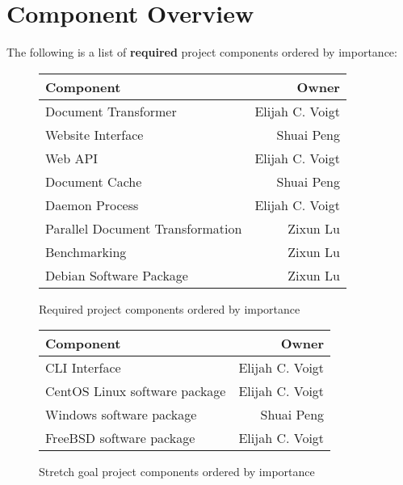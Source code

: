 \section{Component Overview}
\label{component-overview}

The following is a list of \textbf{required} project components ordered by importance:

\begin{figure}
\begin{center}
    \begin{tabular}{ | l | r | }
    \hline
      Component & Owner \\ \hline
      Document Transformer & Elijah C. Voigt \\ \hline
      Website Interface & Shuai Peng \\ \hline
      Web API & Elijah C. Voigt \\ \hline
      Document Cache & Shuai Peng \\ \hline
      Daemon Process & Elijah C. Voigt \\ \hline
      Parallel Document Transformation & Zixun Lu \\ \hline
      Benchmarking & Zixun Lu \\ \hline
      Debian Software Package & Zixun Lu \\ \hline
    \end{tabular}
\end{center}
\caption{Required project components ordered by importance}
\end{figure}

\begin{figure}
\begin{center}
    \begin{tabular}{ | l | r | }
    \hline
      Component & Owner \\ \hline
      CLI Interface & Elijah C. Voigt \\ \hline
      CentOS Linux software package & Elijah C. Voigt \\ \hline
      Windows software package & Shuai Peng \\ \hline
      FreeBSD software package & Elijah C. Voigt  \\ \hline
    \end{tabular}
\end{center}
\caption{Stretch goal project components ordered by importance}
\end{figure}

